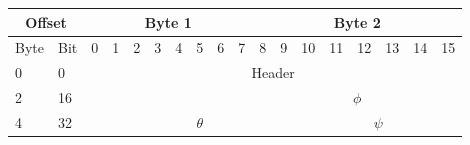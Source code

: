 \begin{table}[H]
\centering
\begin{tabular}{llclllllllllllllll}
\hline
\multicolumn{2}{|c|}{Offset}                          & \multicolumn{8}{c|}{Byte 1}                                                                                                                                                                           & \multicolumn{8}{c|}{Byte 2}                                                                                                                                                                                 \\ \hline
\multicolumn{1}{|l|}{Byte} & \multicolumn{1}{l|}{Bit} & \multicolumn{1}{c|}{0} & \multicolumn{1}{c|}{1} & \multicolumn{1}{c|}{2} & \multicolumn{1}{c|}{3} & \multicolumn{1}{c|}{4} & \multicolumn{1}{c|}{5} & \multicolumn{1}{c|}{6} & \multicolumn{1}{c|}{7} & \multicolumn{1}{c|}{8} & \multicolumn{1}{l|}{9} & \multicolumn{1}{l|}{10} & \multicolumn{1}{l|}{11} & \multicolumn{1}{l|}{12} & \multicolumn{1}{l|}{13} & \multicolumn{1}{l|}{14} & \multicolumn{1}{l|}{15} \\ \hline
\multicolumn{1}{|l|}{0}    & \multicolumn{1}{l|}{0}   & \multicolumn{16}{c|}{Header}                                                                                                                                                                                                                                                                                                                                                                                        \\ \hline
\multicolumn{1}{|l|}{2}    & \multicolumn{1}{l|}{16}  & \multicolumn{8}{l|}{}                                                                                                                                                                                 & \multicolumn{8}{c|}{$\phi$}                                                                                                                                                                                 \\ \hline
\multicolumn{1}{|l|}{4}    & \multicolumn{1}{l|}{32}  & \multicolumn{1}{c|}{}  & \multicolumn{9}{c|}{$\theta$}                                                                                                                                                                                                  & \multicolumn{6}{c|}{$\psi$}                                                                                                                               \\ \hline

\end{tabular}
\end{table}
